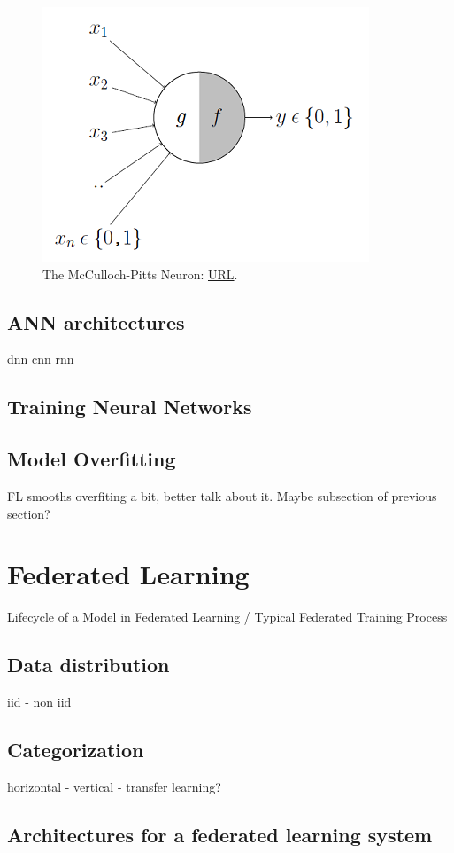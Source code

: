 \begin{figure}[H]
    \centering
        \includegraphics[scale=0.7]{Images/CNNArchitectures/McCulloch-Pitts Neuron.png}
        \decoRule
        \caption[McCulloch-Pitts Neuron]{The McCulloch-Pitts Neuron: \href{https://towardsdatascience.com/mcculloch-pitts-model-5fdf65ac5dd1}{URL}.}
        \label{fig:McCulloch-Pitts Neuron}
\end{figure}


\subsection{ANN architectures}
dnn
cnn
rnn
\subsection{Training Neural Networks}
\subsection{Model Overfitting}
FL smooths overfiting a bit, better talk about it. Maybe subsection of previous section?

\section{Federated Learning}
Lifecycle of a Model in Federated Learning / Typical Federated Training Process
\subsection{Data distribution}
iid - non iid
\subsection{Categorization}
horizontal - vertical - transfer learning?
\subsection{Architectures for a federated learning system}